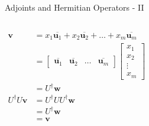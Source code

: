 \documentclass{beamer}
\begin{document}
\begin{frame}{Adjoints and Hermitian Operators - II\tiny{\cite{thespectraltheoremforhermitianmatrice}}}
{\begin{columns}
    \begin{align*}
      \mathbf{v} 
      &= x_1\overline{\mathbf{u}_1} + x_2\overline{\mathbf{u}_2} + \dots + x_m\overline{\mathbf{u}_m} \\
      &= 
      \begin{bmatrix}
        \overline{\mathbf{u}_1} & \overline{\mathbf{u}_2} & \dots & \overline{\mathbf{u}_m}
      \end{bmatrix}
      \begin{bmatrix}
        x_1 \\
        x_2 \\
        \vdots \\
        x_m
      \end{bmatrix} \\
      &= U^{\dagger} \mathbf{w} \\
      U^{\dagger}U\mathbf{v}
      &= U^{\dagger}UU^{\dagger}\mathbf{w} \\
      &= U^{\dagger} \mathbf{w} \\
      &= \mathbf{v}
    \end{align*}
    \end{columns}
  }%
\end{frame}
\end{document}
